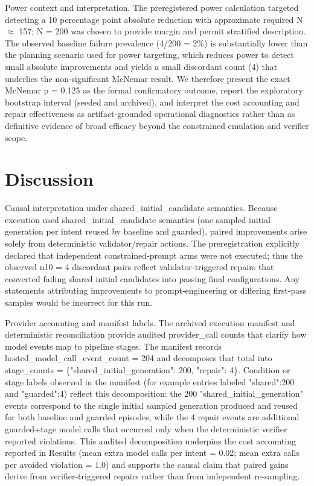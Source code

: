\documentclass[conference]{IEEEtran}
\begin{document}
Power context and interpretation. The preregistered power calculation targeted detecting a 10 percentage point absolute reduction with approximate required N \ensuremath{\approx} 157; N = 200 was chosen to provide margin and permit stratified description. The observed baseline failure prevalence (4/200 = 2\%) is substantially lower than the planning scenario used for power targeting, which reduces power to detect small absolute improvements and yields a small discordant count (4) that underlies the non‑significant McNemar result. We therefore present the exact McNemar p = 0.125 as the formal confirmatory outcome, report the exploratory bootstrap interval (seeded and archived), and interpret the cost accounting and repair effectiveness as artifact‑grounded operational diagnostics rather than as definitive evidence of broad efficacy beyond the constrained emulation and verifier scope.

\section{Discussion}
Causal interpretation under shared\_initial\_candidate semantics. Because execution used shared\_initial\_candidate semantics (one sampled initial generation per intent reused by baseline and guarded), paired improvements arise solely from deterministic validator/repair actions. The preregistration explicitly declared that independent constrained‑prompt arms were not executed; thus the observed n10 = 4 discordant pairs reflect validator‑triggered repairs that converted failing shared initial candidates into passing final configurations. Any statements attributing improvements to prompt‑engineering or differing first‑pass samples would be incorrect for this run.

Provider accounting and manifest labels. The archived execution manifest and deterministic reconciliation provide audited provider\_call counts that clarify how model events map to pipeline stages. The manifest records hosted\_model\_call\_event\_count = 204 and decomposes that total into stage\_counts = \{"shared\_initial\_generation": 200, "repair": 4\}. Condition or stage labels observed in the manifest (for example entries labeled "shared":200 and "guarded":4) reflect this decomposition: the 200 "shared\_initial\_generation" events correspond to the single initial sampled generation produced and reused for both baseline and guarded episodes, while the 4 repair events are additional guarded‑stage model calls that occurred only when the deterministic verifier reported violations. This audited decomposition underpins the cost accounting reported in Results (mean extra model calls per intent = 0.02; mean extra calls per avoided violation = 1.0) and supports the causal claim that paired gains derive from verifier‑triggered repairs rather than from independent re‑sampling.
\end{document}
